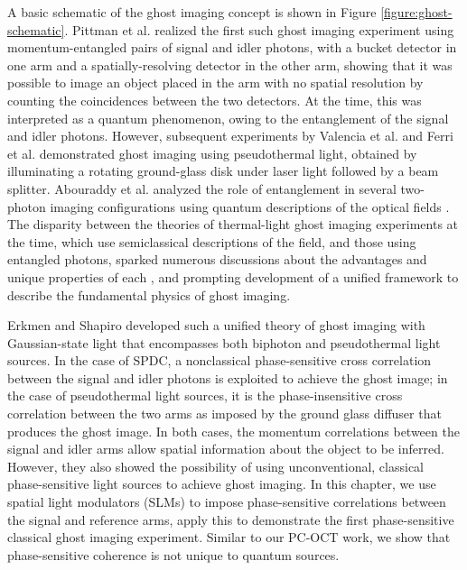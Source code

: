 A basic schematic of the ghost imaging concept is shown in Figure \ref{figure:ghost-schematic}. Pittman et al. realized the first such ghost imaging experiment \cite{pittman-ghost} using momentum-entangled pairs of signal and idler photons, with a bucket detector in one arm and a spatially-resolving detector in the other arm, showing that it was possible to image an object placed in the arm with no spatial resolution by counting the coincidences between the two detectors. At the time, this was interpreted as a quantum phenomenon, owing to the entanglement of the signal and idler photons. However, subsequent experiments by Valencia et al. \cite{valencia-two} and Ferri et al. \cite{ferri-high} demonstrated ghost imaging using pseudothermal light, obtained by illuminating a rotating ground-glass disk under laser light followed by a beam splitter. Abouraddy et al. analyzed the role of entanglement in several two-photon imaging configurations using quantum descriptions of the optical fields \cite{abouraddy-role,abouraddy-fourier}. The disparity between the theories of thermal-light ghost imaging experiments at the time, which use semiclassical descriptions of the field, and those using entangled photons, sparked numerous discussions about the advantages and unique properties of each \cite{dangelo-identifying,bennink-quantum,gatti-entangled}, and prompting development of a unified framework to describe the fundamental physics of ghost imaging.

Erkmen and Shapiro developed such a unified theory of ghost imaging with Gaussian-state light \cite{erkmen-unified} that encompasses both biphoton and pseudothermal light sources. In the case of SPDC, a nonclassical phase-sensitive cross correlation between the signal and idler photons is exploited to achieve the ghost image; in the case of pseudothermal light sources, it is the phase-insensitive cross correlation between the two arms as imposed by the ground glass diffuser that produces the ghost image. In both cases, the momentum correlations between the signal and idler arms allow spatial information about the object to be inferred. However, they also showed the possibility of using unconventional, classical phase-sensitive light sources to achieve ghost imaging. In this chapter, we use spatial light modulators (SLMs) to impose phase-sensitive correlations between the signal and reference arms, apply this to demonstrate the first phase-sensitive classical ghost imaging experiment. Similar to our PC-OCT work, we show that phase-sensitive coherence is not unique to quantum sources.


